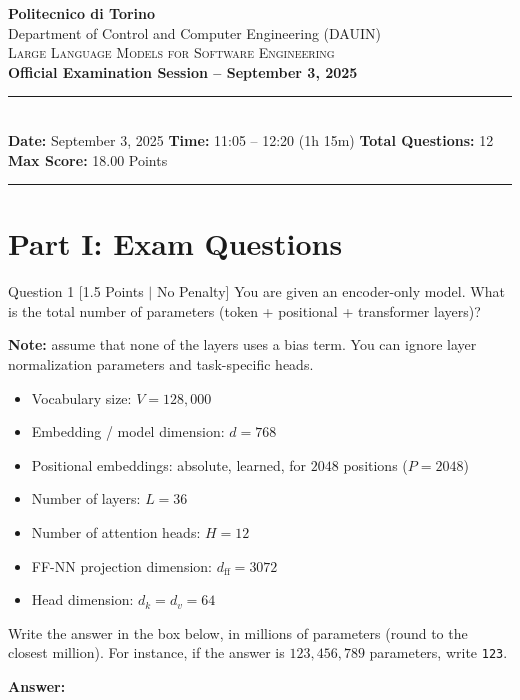 \documentclass[11pt,a4paper]{article}
\begin{document}
\begin{center}
    {\LARGE\textbf{\color{primary}Politecnico di Torino}}\\[0.25cm]
    {\large Department of Control and Computer Engineering (DAUIN)}\\[0.15cm]
    {\large\textsc{Large Language Models for Software Engineering}}\\[0.4cm]
    {\Large\textbf{Official Examination Session -- September 3, 2025}}\\[0.3cm]
    \rule{\textwidth}{0.8pt}\\[0.2cm]
    \small\textbf{Date:} September 3, 2025 \quad\textbar\quad
    \textbf{Time:} 11:05 -- 12:20 (1h 15m) \quad\textbar\quad
    \textbf{Total Questions:} 12 \quad\textbar\quad
    \textbf{Max Score:} 18.00 Points
    \rule{\textwidth}{0.8pt}
\end{center}

\vspace{0.3cm}
\tableofcontents
\newpage

\section{Part I: Exam Questions}

\begin{questionbox}{Question 1 \hfill [1.5 Points $\vert$ No Penalty]}
You are given an encoder-only model. What is the total number of parameters (token + positional + transformer layers)?

\medskip
\textbf{Note:} assume that none of the layers uses a bias term. You can ignore layer normalization parameters and task-specific heads.
\begin{itemize}[noitemsep]
    \item Vocabulary size: $V = 128{,}000$
    \item Embedding / model dimension: $d = 768$
    \item Positional embeddings: absolute, learned, for $2048$ positions ($P = 2048$)
    \item Number of layers: $L = 36$
    \item Number of attention heads: $H = 12$
    \item FF-NN projection dimension: $d_{\text{ff}} = 3072$
    \item Head dimension: $d_k = d_v = 64$
\end{itemize}

Write the answer in the box below, in millions of parameters (round to the closest million). For instance, if the answer is $123{,}456{,}789$ parameters, write \texttt{123}.

\medskip
\textbf{Answer:} \framebox[3cm]{\phantom{98}}
\end{questionbox}
\end{document}

